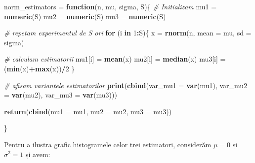 \documentclass[]{article}
\newenvironment{Shaded}{\begin{snugshade}}{\end{snugshade}}
\newcommand{\KeywordTok}[1]{\textcolor[rgb]{0.13,0.29,0.53}{\textbf{#1}}}
\newcommand{\DataTypeTok}[1]{\textcolor[rgb]{0.13,0.29,0.53}{#1}}
\newcommand{\DecValTok}[1]{\textcolor[rgb]{0.00,0.00,0.81}{#1}}
\newcommand{\StringTok}[1]{\textcolor[rgb]{0.31,0.60,0.02}{#1}}
\newcommand{\CommentTok}[1]{\textcolor[rgb]{0.56,0.35,0.01}{\textit{#1}}}
\newcommand{\ControlFlowTok}[1]{\textcolor[rgb]{0.13,0.29,0.53}{\textbf{#1}}}
\newcommand{\OperatorTok}[1]{\textcolor[rgb]{0.81,0.36,0.00}{\textbf{#1}}}
\newcommand{\NormalTok}[1]{#1}
\begin{document}
\begin{Shaded}
\begin{Highlighting}[]
\NormalTok{norm_estimators =}\StringTok{ }\ControlFlowTok{function}\NormalTok{(n, mu, sigma, S)\{}
  \CommentTok{# Initializam}
\NormalTok{  mu1 =}\StringTok{ }\KeywordTok{numeric}\NormalTok{(S)}
\NormalTok{  mu2 =}\StringTok{ }\KeywordTok{numeric}\NormalTok{(S)}
\NormalTok{  mu3 =}\StringTok{ }\KeywordTok{numeric}\NormalTok{(S)}
  
  \CommentTok{# repetam experimentul de S ori}
  \ControlFlowTok{for}\NormalTok{ (i }\ControlFlowTok{in} \DecValTok{1}\OperatorTok{:}\NormalTok{S)\{}
\NormalTok{    x =}\StringTok{ }\KeywordTok{rnorm}\NormalTok{(n, }\DataTypeTok{mean =}\NormalTok{ mu, }\DataTypeTok{sd =}\NormalTok{ sigma)}
    
    \CommentTok{# calculam estimatorii}
\NormalTok{    mu1[i] =}\StringTok{ }\KeywordTok{mean}\NormalTok{(x)}
\NormalTok{    mu2[i] =}\StringTok{ }\KeywordTok{median}\NormalTok{(x)}
\NormalTok{    mu3[i] =}\StringTok{ }\NormalTok{(}\KeywordTok{min}\NormalTok{(x)}\OperatorTok{+}\KeywordTok{max}\NormalTok{(x))}\OperatorTok{/}\DecValTok{2}
\NormalTok{  \}}
  
  \CommentTok{# afisam variantele estimatorilor }
  \KeywordTok{print}\NormalTok{(}\KeywordTok{cbind}\NormalTok{(}\DataTypeTok{var_mu1 =} \KeywordTok{var}\NormalTok{(mu1), }\DataTypeTok{var_mu2 =} \KeywordTok{var}\NormalTok{(mu2), }\DataTypeTok{var_mu3 =} \KeywordTok{var}\NormalTok{(mu3)))}
  
 \KeywordTok{return}\NormalTok{(}\KeywordTok{cbind}\NormalTok{(}\DataTypeTok{mu1 =}\NormalTok{ mu1, }\DataTypeTok{mu2 =}\NormalTok{ mu2, }\DataTypeTok{mu3 =}\NormalTok{ mu3))}
  
\NormalTok{\}}
\end{Highlighting}
\end{Shaded}

Pentru a ilustra grafic histogramele celor trei estimatori, considerăm
\(\mu = 0\) și \(\sigma^2 = 1\) și avem:
\end{document}
